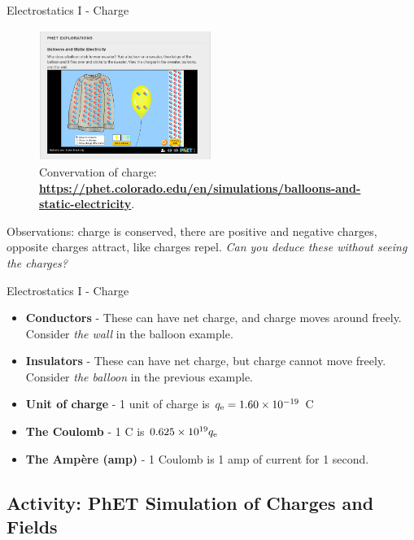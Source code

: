 \documentclass{beamer}
\begin{document}
\begin{frame}{Electrostatics I - Charge}
\small
\begin{figure}
\centering
\includegraphics[width=0.5\textwidth]{figures/balloon.png}
\caption{\label{fig:charge1} Convervation of charge: \textbf{\alert{\url{https://phet.colorado.edu/en/simulations/balloons-and-static-electricity}}}.}
\end{figure}
Observations: charge is conserved, there are positive and negative charges, opposite charges attract, like charges repel.  \textit{Can you deduce these without seeing the charges?}
\end{frame}

\begin{frame}{Electrostatics I - Charge}
\begin{itemize}
\item \textbf{Conductors} - These can have net charge, and charge moves around freely.  Consider \textit{the wall} in the balloon example.
\item \textbf{Insulators} - These can have net charge, but charge cannot move freely.  Consider \textit{the balloon} in the previous example.
\item \textbf{Unit of charge} - 1 unit of charge is $q_{\rm e} = 1.60 \times 10^{-19}$ C
\item \textbf{The Coulomb} - 1 C is $0.625 \times 10^{19} q_{\rm e}$
\item \textbf{The Amp\`{e}re (amp)} - 1 Coulomb is 1 amp of current for 1 second.
\end{itemize}
\end{frame}

\subsection{Activity: PhET Simulation of Charges and Fields}
\end{document}
